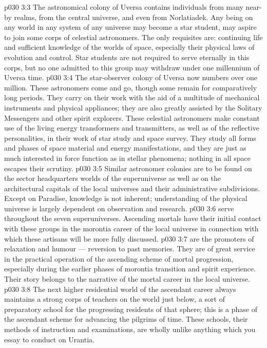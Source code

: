 \vs p030 3:3 The astronomical colony of Uversa contains individuals from many near\hyp{}by realms, from the central universe, and even from Norlatiadek. Any being on any world in any system of any universe may become a star student, may aspire to join some corps of celestial astronomers. The only requisites are: continuing life and sufficient knowledge of the worlds of space, especially their physical laws of evolution and control. Star students are not required to serve eternally in this corps, but no one admitted to this group may withdraw under one millennium of Uversa time.
\vs p030 3:4 The star\hyp{}observer colony of Uversa now numbers over one million. These astronomers come and go, though some remain for comparatively long periods. They carry on their work with the aid of a multitude of mechanical instruments and physical appliances; they are also greatly assisted by the Solitary Messengers and other spirit explorers. These celestial astronomers make constant use of the living energy transformers and transmitters, as well as of the reflective personalities, in their work of star study and space survey. They study all forms and phases of space material and energy manifestations, and they are just as much interested in force function as in stellar phenomena; nothing in all space escapes their scrutiny.
\vs p030 3:5 Similar astronomer colonies are to be found on the sector headquarters worlds of the superuniverse as well as on the architectural capitals of the local universes and their administrative subdivisions. Except on Paradise, knowledge is not inherent; understanding of the physical universe is largely dependent on observation and research.
\vs p030 3:6 \bibnobreakspace {} serve throughout the seven superuniverses. Ascending mortals have their initial contact with these groups in the morontia career of the local universe in connection with which these artisans will be more fully discussed.
\vs p030 3:7 \bibnobreakspace {} are the promoters of relaxation and humour --- reversion to past memories. They are of great service in the practical operation of the ascending scheme of mortal progression, especially during the earlier phases of morontia transition and spirit experience. Their story belongs to the narrative of the mortal career in the local universe.
\vs p030 3:8 \bibnobreakspace {} The next higher residential world of the ascendant career always maintains a strong corps of teachers on the world just below, a sort of preparatory school for the progressing residents of that sphere; this is a phase of the ascendant scheme for advancing the pilgrims of time. These schools, their methods of instruction and examinations, are wholly unlike anything which you essay to conduct on Urantia.
